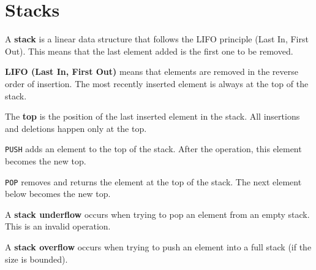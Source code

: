 \documentclass[11pt,a4paper,openany]{book}
\begin{document}
\vspace{2cm}










\chapter{Stacks}



\begin{defnbox}[title=Stack (pile), colback=red!10, colframe=red]
A \textbf{stack} is a linear data structure that follows the LIFO principle
(Last In, First Out).  
This means that the last element added is the first one to be removed.
\end{defnbox}

\begin{defnbox}[title=LIFO principle]
\textbf{LIFO (Last In, First Out)} means that elements are removed in the reverse order of insertion.  
The most recently inserted element is always at the top of the stack.
\end{defnbox}

\begin{defnbox}[title=Top]
The \textbf{top} is the position of the last inserted element in the stack.  
All insertions and deletions happen only at the top.
\end{defnbox}

\begin{defnbox}[title=Push operation]
\texttt{PUSH} adds an element to the top of the stack.  
After the operation, this element becomes the new top.
\end{defnbox}

\begin{defnbox}[title=Pop operation]
\texttt{POP} removes and returns the element at the top of the stack.  
The next element below becomes the new top.
\end{defnbox}

\begin{defnbox}[title=Stack underflow]
A \textbf{stack underflow} occurs when trying to pop an element from an empty stack.  
This is an invalid operation.
\end{defnbox}

\begin{defnbox}[title=Stack overflow]
A \textbf{stack overflow} occurs when trying to push an element into a full stack (if the size is bounded).
\end{defnbox}
\end{document}
